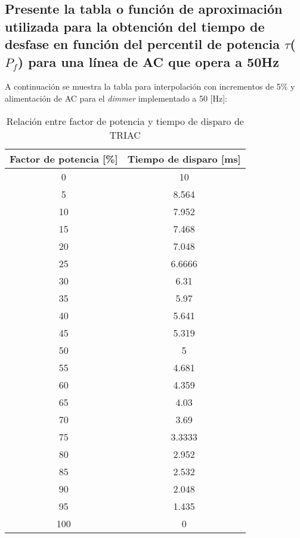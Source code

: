 \documentclass[letterpaper,10.5pt]{article} %
\begin{document}
	\subsection{Presente la tabla o función de aproximación utilizada para la obtención del tiempo de desfase en función del percentil de potencia $\tau$($P_f$) para una línea de AC que opera a 50Hz}
	\noindent
	A continuación se muestra la tabla para interpolación con incrementos de 5\% y alimentación de AC para el \emph{dimmer} implementado a 50 [Hz]:
		\begin{table}[H] %
			\centering %
			\begin{tabular}{c c} %
				\toprule %
				\multicolumn{1}{c}{\bfseries Factor de potencia [\%]} &
				\multicolumn{1}{c}{\bfseries Tiempo de disparo [ms]} \\
				\midrule %
				0 & 10 \\
				5 & 8.564 \\
				10 & 7.952 \\
				15 & 7.468 \\
				20 & 7.048 \\
				25 & 6.6666 \\
				30 & 6.31 \\
				35 & 5.97 \\
				40 & 5.641 \\
				45 & 5.319 \\
				50 & 5 \\
				55 & 4.681 \\
				60 & 4.359 \\
				65 & 4.03 \\
				70 & 3.69 \\
				75 & 3.3333 \\
				80 & 2.952 \\
				85 & 2.532 \\
				90 & 2.048 \\
				95 & 1.435 \\
				100 & 0 \\
				\bottomrule %
			\end{tabular}
			\caption{Relación entre factor de potencia y tiempo de disparo de TRIAC} %
			\label{tbl:pf/tau} %
		\end{table}
\end{document}
